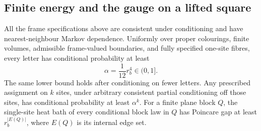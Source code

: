 \subsection{Finite energy and the gauge on a lifted square}

\begin{lemma}\label{l:planeenergy}
All the frame specifications above are consistent under conditioning
and have nearest-neighbour Markov dependence. Uniformly over proper
colourings, finite volumes, admissible frame-valued boundaries, and
fully specified one-site fibres, every letter has conditional
probability at least
\[
 \alpha=\frac1{12}r_b^4\in(0,1].
\]
The same lower bound holds after conditioning on fewer letters.
Any prescribed assignment on \(k\) sites, under arbitrary consistent
partial conditioning off those sites, has conditional probability
at least \(\alpha^k\).
For a finite plane block \(Q\), the single-site heat bath of every conditional block law in \(Q\) has Poincare gap at least
\(r_b^{|E(Q)|}\), where \(E(Q)\) is its internal edge set.
\end{lemma}

